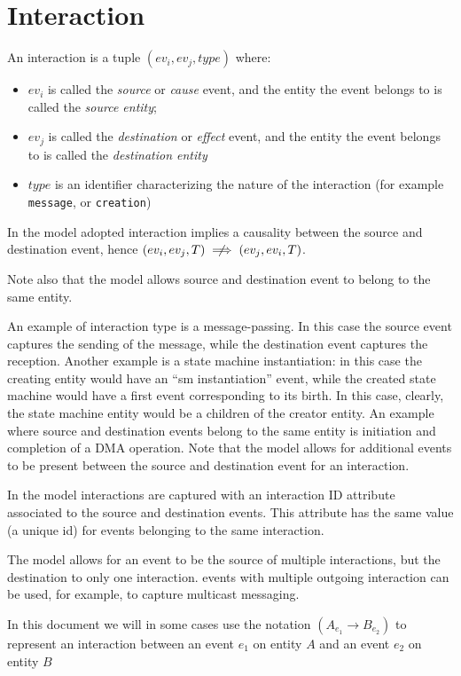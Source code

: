 \documentclass[11pt, twoside, titlepage]{book}
\begin{document}
\section {Interaction}

An interaction is a tuple $(ev_i, ev_j, type)$ where:
\begin{itemize}
  \item $ev_i$ is called the {\it source} or {\it cause} event, and the entity
  the event belongs to is called the {\it source entity};
  \item $ev_j$ is called the {\it destination} or {\it effect} event, and the
  entity the event belongs to is called the {\it destination entity}
  \item $type$ is an identifier characterizing the nature of the interaction
  (for example \texttt{message}, or \texttt{creation})
\end{itemize}
In the model adopted interaction implies a causality between the source and
destination event, hence $(ev_i, ev_j, T) \centernot\implies (ev_j, ev_i, T)$. 

Note also that the model allows source and destination event to belong to the
same entity.

An example of interaction type is a message-passing. In this case the source
event captures the sending of the message, while the destination event captures
the reception. Another example is a state machine instantiation:
in this case the creating entity would have an ``sm instantiation'' event, while
the created state machine would have a first event corresponding to its birth.
In this case, clearly, the state machine entity would be a children of the
creator entity. An example where source and destination events belong to the
same entity is initiation and completion of a DMA operation. 
Note that the model allows for additional events
to be present between the source and destination event for an interaction.

In the model interactions are captured with an interaction ID attribute
associated to the source and destination events. This attribute has the same
value (a unique id) for events belonging to the same  interaction.

The model allows for an event to be the source of multiple interactions, but
the destination to only one interaction. events with multiple outgoing
interaction can be used, for example, to capture multicast messaging.

In this document we will in some cases use the notation $(A_{e_1} \rightarrow
B_{e_2})$ to represent an interaction between an event $e_1$ on entity $A$ and
an event $e_2$ on entity $B$
\end{document}
